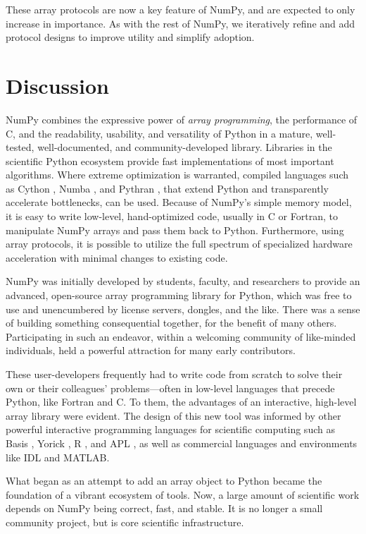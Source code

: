 These array protocols are now a key feature of NumPy, and are expected to only
increase in importance.  As with the rest of NumPy, we iteratively refine and
add protocol designs to improve utility and simplify adoption. 

\section*{Discussion}

NumPy combines the expressive power of \emph{array programming},
the performance of C, and
the readability, usability, and versatility of Python in a mature,
well-tested, well-documented, and community-developed library.
Libraries in the scientific Python ecosystem provide fast implementations of most important algorithms.
Where extreme optimization is warranted, compiled languages such as
Cython \cite{behnel2011cython}, Numba \cite{Lam:2015:NLP:2833157.2833162},
and Pythran \cite{guelton2015pythran}, that
extend Python and transparently accelerate bottlenecks, can be
used.
Because of NumPy's simple memory model, it is easy to write low-level, hand-optimized code, usually in C
or Fortran, to manipulate NumPy arrays and pass them back to
Python.
Furthermore, using array protocols, it is possible to utilize the full
spectrum of specialized hardware acceleration with minimal changes to
existing code.

NumPy was initially developed by students, faculty, and researchers to
provide an advanced, open-source array programming library for Python,
which was free to use and unencumbered by license servers, dongles, and the like.
There was a sense of building something consequential together,
for the benefit of many others.  Participating in
such an endeavor, within a welcoming community of like-minded
individuals, held a powerful attraction for many early contributors.

These user-developers frequently had to write code from scratch to solve
their own or their colleagues' problems---often in low-level languages
that precede Python, like Fortran \cite{dongarra2008netlib} and C.
To them, the advantages of an interactive, high-level array library
were evident. The design of this new tool was informed by other
powerful interactive programming languages for scientific computing
such as Basis \cite{dubois1989basis}, Yorick \cite{munro1995using}, R \cite{ihaka1996r},
and APL \cite{iverson1962programming},
as well as commercial languages and environments like IDL and {MATLAB}.

What began as an attempt to add an array object to Python became the
foundation of a vibrant ecosystem of tools.  Now, a large amount of
scientific work depends on NumPy being correct, fast, and stable.  It
is no longer a small community project, but is core scientific
infrastructure.


